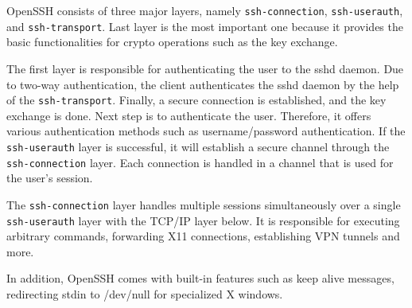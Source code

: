 OpenSSH consists of three major layers, namely \verb|ssh-connection|, \verb|ssh-userauth|, and \verb|ssh-transport|.
Last layer is the most important one because it provides the basic functionalities for crypto operations such as the key exchange.

The first layer is responsible for authenticating the user to the sshd daemon.
Due to two-way authentication, the client authenticates the sshd daemon by the help of the \verb|ssh-transport|.
Finally, a secure connection is established, and the key exchange is done.
Next step is to authenticate the user.
Therefore, it offers various authentication methods such as username/password authentication.
If the \verb|ssh-userauth| layer is successful, it will establish a secure channel through the \verb|ssh-connection| layer.
Each connection is handled in a channel that is used for the user's session.

The \verb|ssh-connection| layer handles multiple sessions simultaneously over a single \verb|ssh-userauth| layer with the TCP/IP layer below.
It is responsible for executing arbitrary commands, forwarding X11 connections, establishing VPN tunnels and more.

In addition, OpenSSH comes with built-in features such as keep alive messages, redirecting stdin to /dev/null for specialized X windows.

